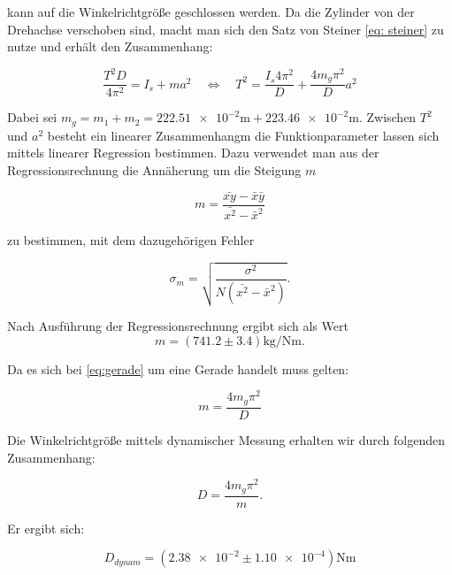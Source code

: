 kann auf die Winkelrichtgröße geschlossen werden.
Da die Zylinder von der Drehachse verschoben sind, macht man sich den
Satz von Steiner \eqref{eq: steiner} zu nutze und erhält den Zusammenhang: %

\begin{equation}
\label{eq:gerade}
\frac{T^2D}{4\pi^2}=I_s+ma^2\quad \Leftrightarrow \quad T^2=\frac{I_s 4\pi^2}{D}+\frac{4m_g\pi^2}{D}a^2
\end{equation}

Dabei sei $m_g=m_1+m_2=\num{222.51e-2}\si{\meter}+\num{223.46e-2}\si{\meter}$.
Zwischen $T^2$ und $a^2$ besteht ein linearer Zusammenhangm
die Funktionparameter lassen sich mittels linearer Regression bestimmen. %
Dazu verwendet man aus der Regressionsrechnung
die Annäherung um die Steigung $m$

\begin{equation*}
m=\frac{\bar{xy}-\bar{x}\bar{y}}{\bar{x^2}-\bar{x}^2}
\end{equation*}

zu bestimmen, mit dem dazugehörigen Fehler

\begin{equation*}
\sigma_m=\sqrt{\frac{\sigma^2}{N(\bar{x^2}-\bar{x}^2)}}.
\end{equation*}

Nach Ausführung der Regressionsrechnung ergibt sich als Wert
\begin{equation}
\label{eq: steigung}
m=\left(\num{741.2}\pm\num{3.4}\right) \si{\kilogram\per\newton\meter}.
\end{equation}

Da es sich bei \eqref{eq:gerade} um eine Gerade handelt muss gelten:

\begin{equation*}
m=\frac{4m_g\pi^2}{D}
\end{equation*}

Die Winkelrichtgröße mittels dynamischer Messung erhalten wir durch folgenden 
Zusammenhang: %

\begin{equation*}
D=\frac{4m_g\pi^2}{m}.
\end{equation*}

Er ergibt sich:

\begin{equation}
\label{winkelrichtgroesse_dynamisch}
D_{dynam}=\left(\num{2.38e-2} \pm \num{1.10e-4}\right)\si{\newton\meter}
\end{equation}

